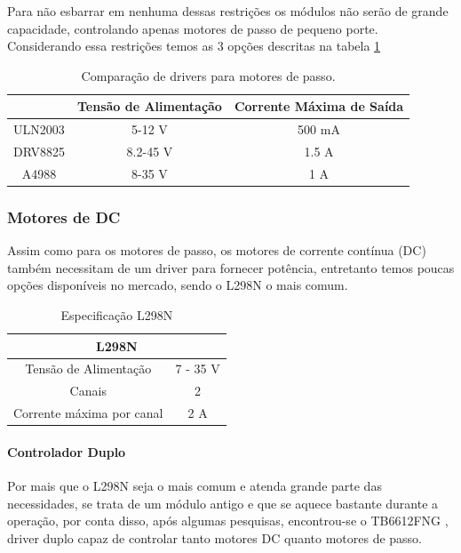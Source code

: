 Para não esbarrar em nenhuma dessas restrições os módulos não serão de grande capacidade, controlando apenas motores de passo de pequeno porte. Considerando essa restrições temos as 3  \cite{STMicroelectronics2002,TexasInstruments214,MicroSystems2014} opções descritas na tabela \ref{tab:drivers}

\begin{table}[h!]
\centering
\begin{tabular}{|c|c|c|}
\hline
        & Tensão de Alimentação & Corrente Máxima de Saída \\ \hline
ULN2003 & 5-12 V                & 500 mA                   \\ \hline
DRV8825 & 8.2-45 V              & 1.5 A                    \\ \hline
A4988   & 8-35 V                & 1 A                      \\ \hline
\end{tabular}
\caption{Comparação de drivers para motores de passo.}
\label{tab:drivers}
\end{table}


\subsubsection*{Motores de DC}

Assim como para os motores de passo, os motores de corrente contínua (DC) também necessitam de um driver para fornecer potência, entretanto temos poucas opções disponíveis no mercado, sendo o L298N \cite{STMicroelectronics2013} o mais comum.

\begin{table}[h!]
\centering
\begin{tabular}{|c|c|}
\hline
\multicolumn{2}{|c|}{L298N}          \\ \hline
Tensão de Alimentação     & 7 - 35 V \\ \hline
Canais                    & 2        \\ \hline
Corrente máxima por canal & 2 A      \\ \hline
\end{tabular}
\caption{Especificação L298N}
\label{tab:l298n}
\end{table}

\paragraph*{Controlador Duplo}
\label{sec:duplo}

Por mais que o L298N seja o mais comum e atenda grande parte das necessidades, se trata de um módulo antigo e que se aquece bastante durante a operação, por conta disso, após algumas pesquisas, encontrou-se o TB6612FNG \cite{Toshiba2008}, driver duplo capaz de controlar tanto motores DC quanto motores de passo.


